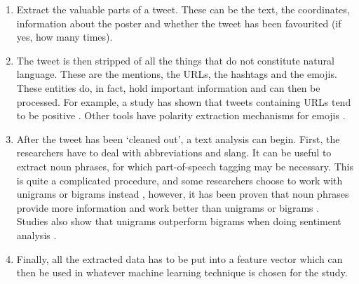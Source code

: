 \begin{enumerate}
    \item Extract the valuable parts of a tweet. These can be the text, the coordinates, information about the poster and whether the tweet has been favourited (if yes, how many times). 
    \item The tweet is then stripped of all the things that do not constitute natural language. These are the mentions, the URLs, the hashtags and the emojis. These entities do, in fact, hold important information and can then be processed. For example, a study has shown that tweets containing URLs tend to be positive \cite{go2009twitter}. Other tools have polarity extraction mechanisms for emojis \cite{novak2015sentiment}. 
    \item After the tweet has been `cleaned out', a text analysis can begin. First, the researchers have to deal with abbreviations and slang. It can be useful to extract noun phrases, for which part-of-speech tagging may be necessary. This is quite a complicated procedure, and some researchers choose to work with unigrams or bigrams instead \cite{mohammad2013nrc}, however, it has been proven that noun phrases provide more information and work better than unigrams or bigrams \cite{whitman2002inferring}. Studies also show that unigrams outperform bigrams when doing sentiment analysis \cite{gamon2004sentiment}.
    \item Finally, all the extracted data has to be put into a feature vector which can then be used in whatever machine learning technique is chosen for the study.
\end{enumerate}



 
 